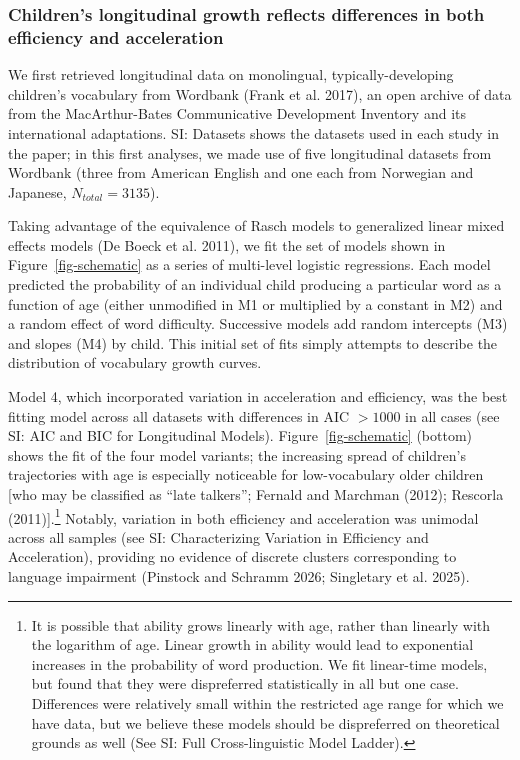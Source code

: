 \documentclass[
  11pt,
]{article}
\begin{document}
\subsubsection{Children's longitudinal growth reflects differences in
both efficiency and
acceleration}\label{childrens-longitudinal-growth-reflects-differences-in-both-efficiency-and-acceleration}

We first retrieved longitudinal data on monolingual,
typically-developing children's vocabulary from Wordbank (Frank et al.
2017), an open archive of data from the MacArthur-Bates Communicative
Development Inventory and its international adaptations. SI: Datasets
shows the datasets used in each study in the paper; in this first
analyses, we made use of five longitudinal datasets from Wordbank (three
from American English and one each from Norwegian and Japanese,
\(N_{total} = 3135\)).

Taking advantage of the equivalence of Rasch models to generalized
linear mixed effects models (De Boeck et al. 2011), we fit the set of
models shown in Figure~\ref{fig-schematic} as a series of multi-level
logistic regressions. Each model predicted the probability of an
individual child producing a particular word as a function of age
(either unmodified in M1 or multiplied by a constant in M2) and a random
effect of word difficulty. Successive models add random intercepts (M3)
and slopes (M4) by child. This initial set of fits simply attempts to
describe the distribution of vocabulary growth curves.

Model 4, which incorporated variation in acceleration and efficiency,
was the best fitting model across all datasets with differences in AIC
\(>1000\) in all cases (see SI: AIC and BIC for Longitudinal Models).
Figure~\ref{fig-schematic} (bottom) shows the fit of the four model
variants; the increasing spread of children's trajectories with age is
especially noticeable for low-vocabulary older children {[}who may be
classified as ``late talkers''; Fernald and Marchman (2012); Rescorla
(2011){]}.\footnote{It is possible that ability grows linearly with age,
  rather than linearly with the logarithm of age. Linear growth in
  ability would lead to exponential increases in the probability of word
  production. We fit linear-time models, but found that they were
  dispreferred statistically in all but one case. Differences were
  relatively small within the restricted age range for which we have
  data, but we believe these models should be dispreferred on
  theoretical grounds as well (See SI: Full Cross-linguistic Model
  Ladder).} Notably, variation in both efficiency and acceleration was
unimodal across all samples (see SI: Characterizing Variation in
Efficiency and Acceleration), providing no evidence of discrete clusters
corresponding to language impairment (Pinstock and Schramm 2026;
Singletary et al. 2025).
\end{document}
